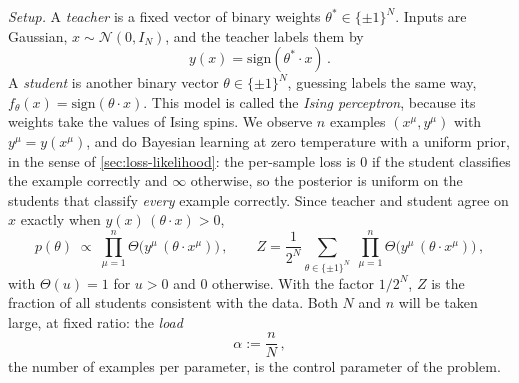 \documentclass[11pt]{article}
\newcommand{\CN}{{\mathcal N}}
\begin{document}
\emph{Setup.} A \emph{teacher} is a fixed vector of binary weights $\theta^*\in\{\pm1\}^N$. Inputs are Gaussian, $x\sim\CN(0,I_N)$, and the teacher labels them by
%
\begin{equation}
    y(x) = \mathrm{sign}(\theta^*\cdot x)\,. \label{perc-teacher}
\end{equation}
%
A \emph{student} is another binary vector $\theta\in\{\pm1\}^N$, guessing labels the same way, $f_\theta(x) = \mathrm{sign}(\theta\cdot x)$. This model is called the \emph{Ising perceptron}, because its weights take the values of Ising spins. We observe $n$ examples $(x^\mu,y^\mu)$ with $y^\mu = y(x^\mu)$, and do Bayesian learning at zero temperature with a uniform prior, in the sense of \cref{sec:loss-likelihood}: the per-sample loss is $0$ if the student classifies the example correctly and $\infty$ otherwise, so the posterior is uniform on the students that classify \emph{every} example correctly. Since teacher and student agree on $x$ exactly when $y(x)\,(\theta\cdot x)>0$,
%
\begin{equation}
    p(\theta) \;\propto\; \prod_{\mu=1}^n\Theta\big(y^\mu\,(\theta\cdot x^\mu)\big)\,,\qquad
    Z = \frac{1}{2^N}\sum_{\theta\in\{\pm1\}^N}\;\prod_{\mu=1}^n\Theta\big(y^\mu\,(\theta\cdot x^\mu)\big)\,, \label{perc-Z}
\end{equation}
%
with $\Theta(u) = 1$ for $u>0$ and $0$ otherwise. With the factor $1/2^N$, $Z$ is the fraction of all students consistent with the data. Both $N$ and $n$ will be taken large, at fixed ratio: the \emph{load}
%
\begin{equation}
    \alpha := \frac{n}{N}\,, \label{load}
\end{equation}
%
the number of examples per parameter, is the control parameter of the problem.
\end{document}

